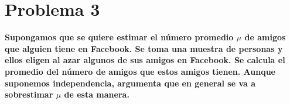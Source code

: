 \section*{Problema 3}

\textbf{Supongamos que se quiere estimar el número promedio
    $\mu$ de amigos que alguien tiene en Facebook. Se toma una muestra de
    personas y ellos eligen al azar algunos de sus amigos en Facebook. Se
    calcula el promedio del número de amigos que estos amigos tienen. Aunque
    suponemos independencia, argumenta que en general se va a sobrestimar
    $\mu$ de esta manera.}